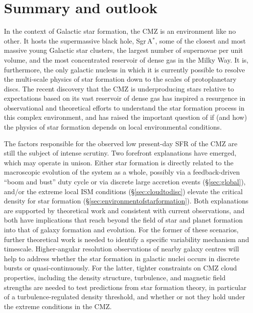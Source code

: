 \section{Summary and outlook}\label{sec:summary}

In the context of Galactic star formation, the CMZ is an environment like no other. It hosts the supermassive black hole, Sgr\,A$^{*}$, some of the closest and most massive young Galactic star clusters, the largest number of supernovae per unit volume, and the most concentrated reservoir of dense gas in the Milky Way. It is, furthermore, the only galactic nucleus in which it is currently possible to resolve the multi-scale physics of star formation down to the scales of protoplanetary discs. The recent discovery that the CMZ is underproducing stars relative to expectations based on its vast reservoir of dense gas has inspired a resurgence in observational and theoretical efforts to understand the star formation process in this complex environment, and has raised the important question of if (and how) the physics of star formation depends on local environmental conditions.

The factors responsible for the observed low present-day SFR of the CMZ are still the subject of intense scrutiny. Two forefront explanations have emerged, which may operate in unison. Either star formation is directly related to the macroscopic evolution of the system as a whole, possibly via a feedback-driven ``boom and bust'' duty cycle or via discrete large accretion events (\S\ref{sec:global}), and/or the extreme local ISM conditions (\S\ref{sec:cloudtodisc}) elevate the critical density for star formation (\S\ref{sec:environmentofstarformation}). Both explanations are supported by theoretical work and consistent with current observations, and both have implications that reach beyond the field of star and planet formation into that of galaxy formation and evolution. 
For the former of these scenarios, further theoretical work is needed to identify a specific variability mechanism and timescale. Higher-angular resolution observations of nearby galaxy centres will help to address whether the star formation in galactic nuclei occurs in discrete bursts or quasi-continuously. For the latter, tighter constraints on CMZ cloud properties, including the density structure, turbulence, and magnetic field strengths are needed to test predictions from star formation theory, in particular of a turbulence-regulated density threshold, and whether or not they hold under the extreme conditions in the CMZ.  

